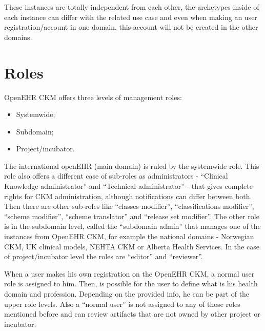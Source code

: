 \documentclass[mim_thesis.tex]{subfiles}
\begin{document}
These instances are totally independent from each other, the archetypes inside of each instance can differ with the related use case and even when making an user registration/account in one domain, this account will not be created in the other domains.

\section{Roles}
OpenEHR CKM offers three levels of management roles:
\begin{itemize}[noitemsep]
\item Systemwide; 
\item Subdomain; 
\item Project/incubator.
\end{itemize}

The international openEHR (main domain) is ruled by the systemwide role. This role also offers a different case of sub-roles as administrators - “Clinical Knowledge administrator” and “Technical administrator” - that gives complete rights for CKM administration, although notifications can differ between both. Then there are other sub-roles like “classes modifier”, “classifications modifier”, “scheme modifier”, “scheme translator” and “release set modifier”. The other role is in the subdomain level, called the “subdomain admin” that manages one of the instances from OpenEHR CKM, for example the national domains - Norwegian CKM, UK clinical models, NEHTA CKM or Alberta Health Services. In the case of project/incubator level the roles are “editor” and “reviewer”.\par
When a user makes his own registration on the OpenEHR CKM, a normal user role is assigned to him. Then, is possible for the user to define what is his health domain and profession. Depending on the provided info, he can be part of the upper role levels. Also a “normal user” is not assigned to any of those roles mentioned before and can review artifacts that are not owned by other project or incubator. 
\end{document}
